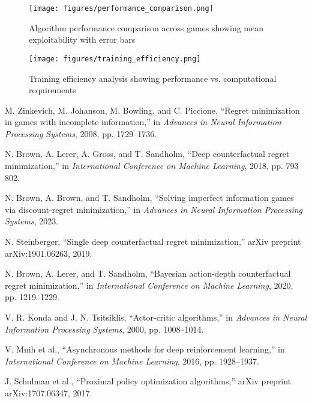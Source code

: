 \documentclass{icml2024}
\begin{document}
\begin{figure}[h]
\centering
\texttt{[image: figures/performance\_comparison.png]}
\caption{Algorithm performance comparison across games showing mean exploitability with error bars}
\label{fig:performance_comparison}
\end{figure}

\begin{figure}[h]
\centering
\texttt{[image: figures/training\_efficiency.png]}
\caption{Training efficiency analysis showing performance vs. computational requirements}
\label{fig:training_efficiency}
\end{figure}

\twocolumn


\begin{thebibliography}{99}

M. Zinkevich, M. Johanson, M. Bowling, and C. Piccione, ``Regret minimization in games with incomplete information,'' in \emph{Advances in Neural Information Processing Systems}, 2008, pp. 1729--1736.

N. Brown, A. Lerer, A. Gross, and T. Sandholm, ``Deep counterfactual regret minimization,'' in \emph{International Conference on Machine Learning}, 2018, pp. 793--802.

N. Brown, A. Brown, and T. Sandholm, ``Solving imperfect information games via discount-regret minimization,'' in \emph{Advances in Neural Information Processing Systems}, 2023.

N. Steinberger, ``Single deep counterfactual regret minimization,'' arXiv preprint arXiv:1901.06263, 2019.

N. Brown, A. Lerer, and T. Sandholm, ``Bayesian action-depth counterfactual regret minimization,'' in \emph{International Conference on Machine Learning}, 2020, pp. 1219--1229.

V. R. Konda and J. N. Tsitsiklis, ``Actor-critic algorithms,'' in \emph{Advances in Neural Information Processing Systems}, 2000, pp. 1008--1014.

V. Mnih et al., ``Asynchronous methods for deep reinforcement learning,'' in \emph{International Conference on Machine Learning}, 2016, pp. 1928--1937.

J. Schulman et al., ``Proximal policy optimization algorithms,'' arXiv preprint arXiv:1707.06347, 2017.


\end{thebibliography}
\end{document}
